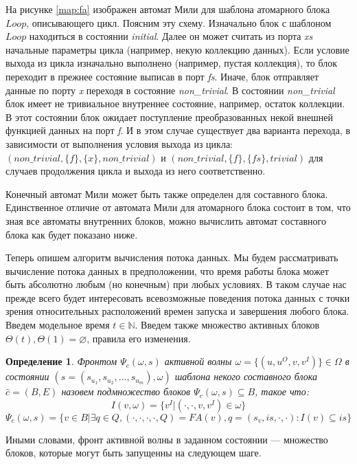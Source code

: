 \documentclass[10pt,a4paper]{article}
\newtheorem{defen}{Определение}
\newcommand{\FA}{F\!A}
\begin{document}
На рисунке \ref{map:fa} изображен автомат Мили для шаблона атомарного блока $Loop$, описывающего цикл. Поясним эту схему.
Изначально блок с шаблоном $Loop$ находиться в состоянии \textit{initial}.
Далее он может считать из порта \textit{xs} начальные параметры цикла (например, некую коллекцию данных).
Если условие выхода из цикла изначально выполнено (например, пустая коллекция), то блок переходит в прежнее состояние выписав в порт \textit{fs}.
Иначе, блок отправляет данные по порту \textit{x} переходя в состояние \textit{non\_trivial}. В состоянии \textit{non\_trivial} блок имеет не тривиальное внутреннее состояние,
например, остаток коллекции. В этот состоянии блок ожидает поступление преобразованных некой внешней функцией данных на порт \textit{f}.
И в этом случае существует два варианта перехода, в зависимости от выполнения условия выхода из цикла:
$(non\_trivial, \{f\}, \{x\}, non\_trivial)$ и $(non\_trivial, \{f\}, \{fs\}, trivial)$ для случаев продолжения цикла и выхода из него соответственно.

Конечный автомат Мили может быть также определен для составного блока. Единственное отличие от автомата Мили для атомарного блока состоит в том, что
зная все автоматы внутренних блоков, можно вычислить автомат составного блока как будет показано ниже.

Теперь опишем алгоритм вычисления потока данных. Мы будем рассматривать вычисление потока данных в предположении, что время работы блока может быть абсолютно любым (но конечным) при любых условиях. В таком случае нас прежде всего будет интересовать всевозможные поведения потока данных с точки зрения относительных расположений времен запуска и завершения любого блока.
Введем модельное время $t \in \mathbb{N}$. Введем также множество активных блоков $\Theta(t), \Theta(1) = \varnothing$, правила его изменения.

\begin{defen}
  Фронтом $\Psi_c (\omega, s)$ активной волны $\omega = \{(u, u^O, v, v^I)\} \in \Omega$ в состоянии $(s = (s_{u_1}, s_{u_2}, \dots, s_{u_m}), \omega)$ шаблона некого составного блока $\hat{c} = (B, E)$ назовем подмножество блоков $\Psi_c (\omega, s) \subseteq B$, такое что:
  $$I(v, \omega) = \{v^I \vert (\cdot, \cdot, v, v^I) \in \omega\}$$
  $$\Psi_c (\omega, s) = \{ v \in B \vert \exists q \in Q, (\cdot, \cdot, \cdot, \cdot, Q) = \FA(v), q = (s_v, is, \cdot, \cdot): I(v) \subseteq is \}$$
\end{defen}

Иными словами, фронт активной волны в заданном состоянии --- множество блоков, которые могут быть запущенны на следующем шаге.
\end{document}
